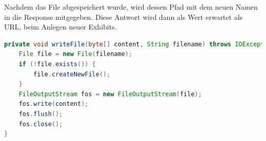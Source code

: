 Nachdem das File abgespeichert wurde, wird dessen Pfad mit dem neuen Namen in die Response mitgegeben. 
Diese Antwort wird dann als Wert erwartet als URL, beim Anlegen neuer Exhibits. 

\begin{lstlisting}[label=lst:fileupload, language=Java, caption=Hochladen der Dateien]
private void writeFile(byte[] content, String filename) throws IOException {
    File file = new File(filename);
    if (!file.exists()) {
        file.createNewFile();
    }
    FileOutputStream fos = new FileOutputStream(file);
    fos.write(content);
    fos.flush();
    fos.close();
}
\end{lstlisting}
